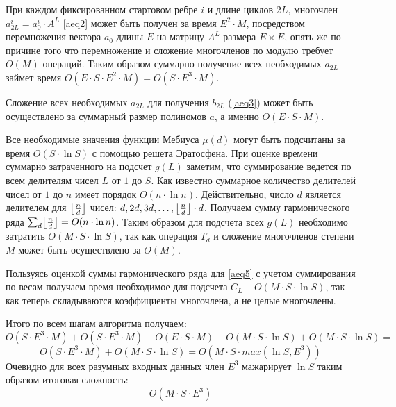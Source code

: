 При каждом фиксированном стартовом ребре $i$ и длине циклов $2L$, многочлен $a_{2L}^i=a_0^i \cdot A^L$ \ref{aeq2}
может быть получен за время $E^2 \cdot M$, посредством перемножения вектора $a_0$ длины $E$ на матрицу
$A^L$ размера $E \times E$, опять же по причине того что перемножение и сложение многочленов по модулю 
требует $O(M)$ операций. Таким образом суммарно получение всех необходимых $a_{2L}$ займет
 время $O(E \cdot S \cdot E^2 \cdot M) = O(S \cdot E^3 \cdot M)$.

Сложение всех необходимых $a_{2L}$ для получения $b_{2L}$ (\ref{aeq3}) может быть осуществлено за суммарный размер 
полиномов $a$, а именно $O(E \cdot S \cdot M)$.

Все необходимые значения функции Мебиуса $\mu(d)$ могут быть подсчитаны за время $O(S \cdot \ln S)$ с
помощью решета Эратосфена. При оценке времени суммарно затраченного на подсчет $g(L)$ заметим,
 что суммирование ведется по всем делителям чисел $L$ от $1$ до $S$. Как известно суммарное количество
делителей чисел от $1$ до $n$ имеет порядок $O(n \cdot \ln n)$. Действительно, число $d$ является 
делителем для $\floor*{\frac{n}{d}}$ чисел: $d, 2d, 3d, \ldots, \floor*{\frac{n}{d}} \cdot d$. Получаем сумму гармонического ряда
 $\sum_d \floor*{\frac{n}{d}} = O(n \cdot \ln n)$. Таким образом для подсчета всех $g(L)$ необходимо затратить $O(M \cdot S \cdot \ln S)$,
так как операция $T_d$ и сложение многочленов степени $M$ может быть осуществлено за $O(M)$.

Пользуясь оценкой суммы гармонического ряда для \ref{aeq5} с учетом суммирования по весам получаем
время необходимое для подсчета $C_L$ -- $O(M \cdot S \cdot \ln S)$, так как теперь складываются 
коэффициенты многочлена, а не целые многочлены.

Итого по всем шагам алгоритма получаем:
\[
O(S \cdot E^3 \cdot M) + O(S \cdot E^3 \cdot M) + 
O(E \cdot S \cdot M) + O(M \cdot S \cdot \ln S) + O(M \cdot S \cdot \ln S)= 
\]
\[
O(S \cdot E^3 \cdot M) + O(M \cdot S \cdot \ln S) = O(M \cdot S \cdot max(\ln S, E^3))
\]
Очевидно для всех разумных входных данных член $E^3$ мажарирует $\ln S$ таким образом итоговая сложность:
\[
  O(M \cdot S \cdot E^3)
\]
